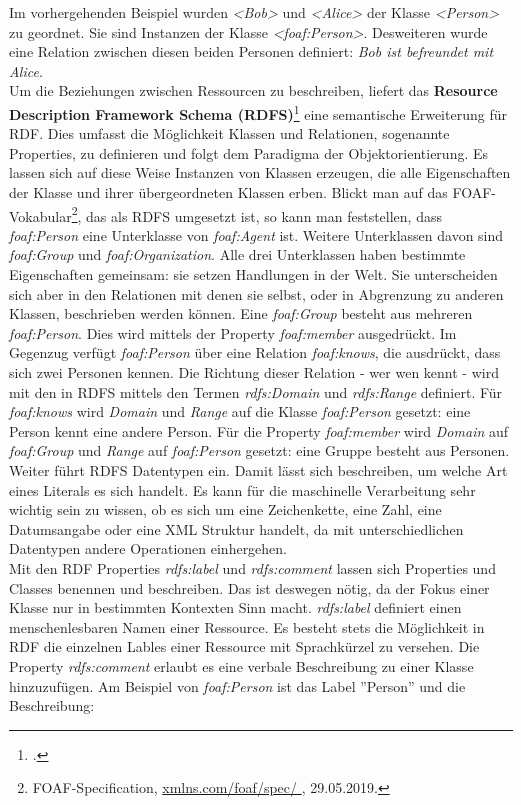 \documentclass[12pt,a4paper]{article}
\begin{document}
Im vorhergehenden Beispiel wurden \textit{<Bob>} und \textit{<Alice>} der Klasse \textit{<Person>} zu geordnet. Sie sind Instanzen der Klasse \textit{<foaf:Person>}. Desweiteren wurde eine Relation zwischen diesen beiden Personen definiert: \textit{Bob ist befreundet mit Alice}.
\\
Um die Beziehungen zwischen Ressourcen zu beschreiben, liefert das \textbf{Resource Description Framework Schema (RDFS)}\footcite[][]{brickley2014rdf} eine semantische Erweiterung für RDF. Dies umfasst die Möglichkeit Klassen und Relationen, sogenannte Properties, zu definieren und folgt dem Paradigma der Objektorientierung. Es lassen sich auf diese Weise Instanzen von Klassen erzeugen, die alle Eigenschaften der Klasse und ihrer übergeordneten Klassen erben. Blickt man auf das FOAF-Vokabular\footnote{FOAF-Specification, \protect\url{xmlns.com/foaf/spec/ }, 29.05.2019.}, das als RDFS umgesetzt ist, so kann man feststellen, dass \textit{foaf:Person} eine Unterklasse von \textit{foaf:Agent} ist. Weitere Unterklassen davon sind \textit{foaf:Group} und \textit{foaf:Organization}. Alle drei Unterklassen haben bestimmte Eigenschaften gemeinsam: sie setzen Handlungen in der Welt. Sie unterscheiden sich aber in den Relationen mit denen sie selbst, oder in Abgrenzung zu anderen Klassen, beschrieben werden können. Eine \textit{foaf:Group} besteht aus mehreren \textit{foaf:Person}. Dies wird mittels der Property \textit{foaf:member} ausgedrückt. Im Gegenzug verfügt \textit{foaf:Person} über eine Relation \textit{foaf:knows}, die ausdrückt, dass sich zwei Personen kennen. Die Richtung dieser Relation - wer wen kennt - wird mit den in RDFS mittels den Termen \textit{rdfs:Domain} und \textit{rdfs:Range} definiert. 
Für \textit{foaf:knows} wird \textit{Domain} und \textit{Range} auf die Klasse\textit{ foaf:Person} gesetzt: eine Person kennt eine andere Person. Für die Property \textit{foaf:member} wird \textit{Domain} auf \textit{foaf:Group} und \textit{Range} auf \textit{foaf:Person} gesetzt: eine Gruppe besteht aus Personen.
\\
Weiter führt RDFS Datentypen ein. Damit lässt sich beschreiben, um welche Art eines Literals es sich handelt. Es kann für die maschinelle Verarbeitung sehr wichtig sein zu wissen, ob es sich um eine Zeichenkette, eine Zahl, eine Datumsangabe oder eine XML Struktur handelt, da mit unterschiedlichen Datentypen andere Operationen einhergehen. 
\\
Mit den RDF Properties \textit{rdfs:label} und \textit{rdfs:comment} lassen sich Properties und Classes benennen und beschreiben. Das ist deswegen nötig, da der Fokus einer Klasse nur in bestimmten Kontexten Sinn macht. \textit{rdfs:label} definiert einen menschenlesbaren Namen einer Ressource. Es besteht stets die Möglichkeit in RDF die einzelnen Lables einer Ressource mit Sprachkürzel zu versehen. Die Property \textit{rdfs:comment} erlaubt es eine verbale Beschreibung zu einer Klasse hinzuzufügen. Am Beispiel von \textit{foaf:Person} ist das Label ''Person'' und die Beschreibung:
\end{document}
